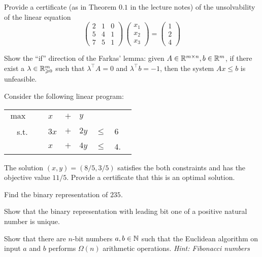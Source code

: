 \documentclass[11pt]{article}
\institute{\'Ecole Polytechnique F\'ed\'erale de Lausanne}
\begin{document}
\makeheader

\problem
Provide a certificate (as in Theorem $0.1$ in the lecture notes) of the unsolvability of the linear equation 
  \begin{displaymath}
    \begin{pmatrix}
      2 & 1 & 0 \\
      5 & 4 & 1 \\
      7 & 5 & 1
    \end{pmatrix} \,
    \begin{pmatrix}
      x_1 \\ x_2 \\ x_3 
    \end{pmatrix} =
    \begin{pmatrix}
      1\\2\\4
    \end{pmatrix}
  \end{displaymath}

 \problem Show the ``if'' direction of the Farkas' lemma: given $A\in \mathbb{R}^{m\times n}, b\in \mathbb{R}^m$, if there exist a $\lambda \in \mathbb{R}^m_{\geqslant 0}$ such that $\lambda^\top A=0$ and $\lambda^\top b=-1$, then the system $Ax\leq b$ is unfeasible.
 
\problem Consider the following linear program:
\begin{center}
\begin{tabular}{rllllll}
$\max$ & \ & $x$ & $+$ & $y$ & \ & \\ 
s.t. & \ & $3x$ & $+$ & $2y$ & $\leq$ & $6$ \\ 
\ & \ & $x$ & $+$ & $4y$ & $\leq$ & $4$. \
\end{tabular} 
\end{center} 
The solution $(x, y)=(8/5 , 3/5)$ satisfies the both constraints and has the objective value $11/5$. Provide a certificate that this is an optimal solution.

\problem Find the binary representation of $235$. 

\problem Show that the binary representation with leading bit one of a positive natural number is unique.
 
\problem Show that there are $n$-bit numbers $a,b \in \mathbb{N}$ such that the  Euclidean algorithm on input $a$ and $b$ performs  $\Omega(n)$ arithmetic operations. \emph{Hint: Fibonacci numbers} 
\end{document}
